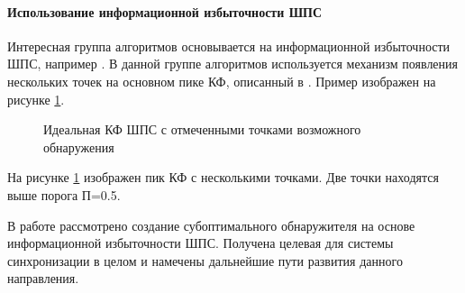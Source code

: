 \paragraph{Использование информационной избыточности ШПС}
Интересная группа алгоритмов основывается на информационной избыточности ШПС, например \cite{phd_che}. В данной
группе алгоритмов используется механизм появления нескольких точек на основном пике КФ, описанный в \cite{kaplan}. Пример
изображен на рисунке \ref{pic:sec1_peak_tcd}.

\begin{figure}[H]
	\center{}
	\caption{Идеальная КФ ШПС с отмеченными точками возможного обнаружения}
	\label{pic:sec1_peak_tcd}
\end{figure}

На рисунке \ref{pic:sec1_peak_tcd} изображен пик КФ с несколькими точками. Две точки находятся выше порога П=0.5.

В работе \cite{phd_che} рассмотрено создание субоптимального обнаружителя на основе информационной избыточности ШПС.
Получена целевая для системы синхронизации в целом и намечены дальнейшие пути развития данного направления.
